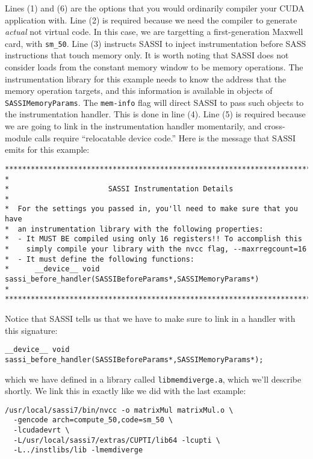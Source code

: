 Lines (1) and (6) are the options that you would ordinarily compiler
your CUDA application with.  Line (2) is required because we need the
compiler to generate \emph{actual} not virtual code.  In this case, we
are targetting a first-generation Maxwell card, with \texttt{sm\_50}.
Line (3) instructs SASSI to inject instrumentation before SASS
instructions that touch memory only.  It is worth noting that SASSI
does not consider loads from the constant memory window to be memory
operations.  The instrumentation library for this
example needs to know the address that the memory operation targets,
and this information is available in objects of
\texttt{SASSIMemoryParams}.  The
\texttt{mem-info} flag will direct SASSI to pass such objects
to the instrumentation handler.  This is done in line (4).  Line (5)
is required because we are going to link in the instrumentation
handler momentarily, and cross-module calls require ``relocatable
device code.''  Here is the message that SASSI emits for this example:
\begin{verbatim}
******************************************************************************
*
*                       SASSI Instrumentation Details
*
*  For the settings you passed in, you'll need to make sure that you have
*  an instrumentation library with the following properties:
*  - It MUST BE compiled using only 16 registers!! To accomplish this
*    simply compile your library with the nvcc flag, --maxrregcount=16
*  - It must define the following functions:
*      __device__ void sassi_before_handler(SASSIBeforeParams*,SASSIMemoryParams*)
*
******************************************************************************
\end{verbatim}

Notice that SASSI tells us that we have to make sure to link in a
handler with this signature:
\begin{lstlisting}
__device__ void sassi_before_handler(SASSIBeforeParams*,SASSIMemoryParams*);
\end{lstlisting}
which we have defined in a library called \texttt{libmemdiverge.a}, which
we'll describe shortly.  We link this in exactly like we did with the
last example:
\begin{lstlisting}[style=BashInputStyle]
/usr/local/sassi7/bin/nvcc -o matrixMul matrixMul.o \
  -gencode arch=compute_50,code=sm_50 \
  -lcudadevrt \
  -L/usr/local/sassi7/extras/CUPTI/lib64 -lcupti \
  -L../instlibs/lib -lmemdiverge
\end{lstlisting}

